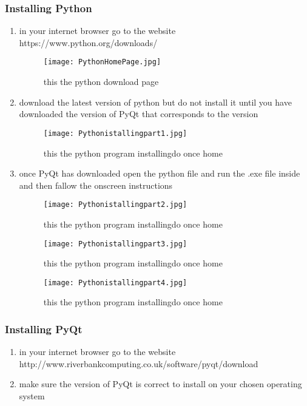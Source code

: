 \subsubsection{Installing Python}
\begin{enumerate}
\item in your internet browser go to the website\newline
https://www.python.org/downloads/
\begin{figure}
\texttt{[image: PythonHomePage.jpg]}
\caption{this the python download page\label{Pyth1}}
\end{figure}
\item download the latest version of python but do not install it until you have downloaded the version of PyQt that corresponds to the version 
\begin{figure}
\texttt{[image: Pythonistallingpart1.jpg]}
\caption{this the python program installing{do once home}\label{Pyth.istprt1}}
\end{figure}
\item once PyQt has downloaded open the python file and run the .exe file inside and then fallow the onscreen instructions
\begin{figure}
\texttt{[image: Pythonistallingpart2.jpg]}
\caption{this the python program installing{do once home}\label{Pyth.istprt2}}
\end{figure}
\begin{figure}
\texttt{[image: Pythonistallingpart3.jpg]}
\caption{this the python program installing{do once home}\label{Pyth.istprt3}}
\end{figure}
\begin{figure}
\texttt{[image: Pythonistallingpart4.jpg]}
\caption{this the python program installing{do once home}\label{Pyth.istprt4}}
\end{figure}
\end{enumerate}
\subsubsection{Installing PyQt}
\begin{enumerate}
\item in your internet browser go to the website\newline
http://www.riverbankcomputing.co.uk/software/pyqt/download
\item make sure the version of PyQt is correct to install on your chosen operating system 

\end{enumerate}
